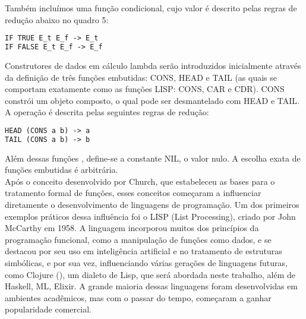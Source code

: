 Também incluímos uma função condicional, cujo valor é descrito pelas regras de redução abaixo no quadro 5:

\begin{tcolorbox}[colback=gray!5!white, colframe=gray!75!black, title={Quadro 5 - Função Condicional no Cálculo Lambda}]
\begin{lstlisting}[language=Lisp]
IF TRUE E_t E_f -> E_t
IF FALSE E_t E_f -> E_f
\end{lstlisting}
\caption{}
\end{tcolorbox}

Construtores de dados em cálculo lambda serão introduzidos inicialmente através da definição de três funções embutidas: CONS, HEAD e TAIL (as quais se comportam exatamente como as funções LISP: CONS, CAR e CDR).
CONS constrói um objeto composto, o qual pode ser desmantelado com HEAD e  TAIL. A operação é descrita pelas seguintes regras de redução:

\begin{tcolorbox}[colback=gray!5!white, colframe=gray!75!black, title={Quadro 6 - Construtores de Dados no Cálculo Lambda}]
\begin{lstlisting}[language=Lisp]
HEAD (CONS a b) -> a
TAIL (CONS a b) -> b
\end{lstlisting}
\caption{}
\end{tcolorbox}

Além dessas funções , define-se a constante NIL, o valor nulo. A escolha exata de funções embutidas é arbitrária.\\


Após o conceito desenvolvido por Church, que estabeleceu as bases para o tratamento formal de funções, esses conceitos começaram a influenciar diretamente o desenvolvimento de linguagens de programação. Um dos primeiros exemplos práticos dessa influência foi o LISP (List Processing), criado por John McCarthy em 1958. A linguagem incorporou muitos dos princípios da programação funcional, como a manipulação de funções como dados, e se destacou por seu uso em inteligência artificial e no tratamento de estruturas simbólicas, e por sua vez, influenciando várias gerações de linguagens futuras, como Clojure (), um dialeto de Lisp, que será abordada neste trabalho, além de Haskell, ML, Elixir. A grande maioria dessas linguagens foram desenvolvidas em ambientes acadêmicos, mas com o passar do tempo, começaram a ganhar popularidade comercial.

